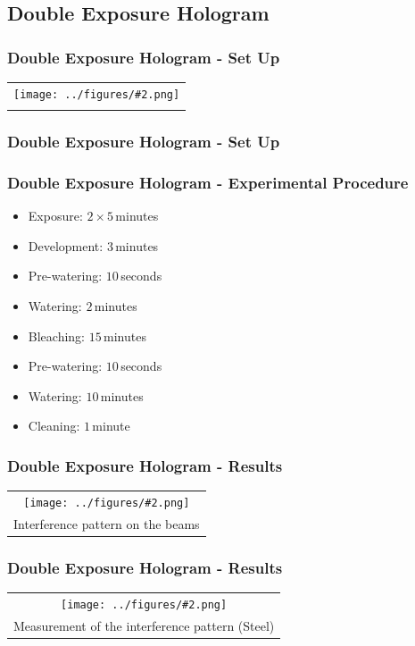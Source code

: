 \documentclass{beamer}
\newcommand{\gra}[3][]{
	\begin{table}
	\centering
	\begin{tabular}[width=\textwidth]{c}
		\texttt{[image: ../figures/\#2.png]}\\
		\small #3
	\end{tabular}
	\end{table}
}
\begin{document}
\subsection{Double Exposure Hologram}
\frame{\tableofcontents[currentsubsection]}
\begin{frame}
	\frametitle{Double Exposure Hologram - Set Up}
	\gra[0.85]{Versuchsaufbau_2}{}%
\end{frame}
\begin{frame}
	\frametitle{Double Exposure Hologram - Set Up}
	\begin{figure}
		\centering
	\end{figure}
\end{frame}
\begin{frame}
	\frametitle{Double Exposure Hologram - Experimental Procedure}
	\begin{itemize}
		\item Exposure: $2\times5\,$minutes
		\item Development: $3\,$minutes
		\item Pre-watering: $10\,$seconds
		\item Watering: $2\,$minutes
		\item Bleaching: $15\,$minutes
		\item Pre-watering: $10\,$seconds
		\item Watering: $10\,$minutes
		\item Cleaning: $1\,$minute
	\end{itemize}
\end{frame}
\begin{frame}
	\frametitle{Double Exposure Hologram - Results}
	\gra[0.8]{staebe4}{Interference pattern on the beams}
\end{frame}
\begin{frame}
	\frametitle{Double Exposure Hologram - Results}
	\gra[0.8]{staebe2}{Measurement of the interference pattern (Steel)}
\end{frame}
\end{document}
